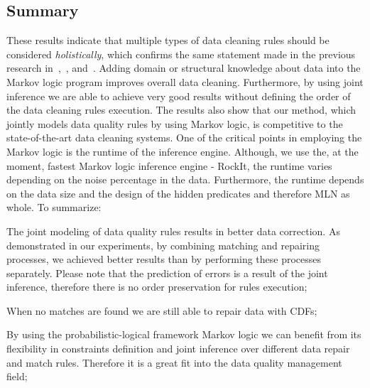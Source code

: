 \subsection{Summary}
These results indicate that multiple types of data cleaning rules should be considered \textit{holistically}, which confirms the same statement made in the previous research in~\cite{Dallachiesa:2013:NCD:2463676.2465327},~\cite{Fan:2014:IRM:2628135.2567657}, and~\cite{Fan:2011:IRM:1989323.1989373}. Adding domain or structural knowledge about data into the Markov logic program improves overall data cleaning. Furthermore, by using joint inference we are able to achieve very good results without defining the order of the data cleaning rules execution. The results also show that our method, which jointly models data quality rules by using Markov logic, is competitive to the state-of-the-art data cleaning systems. One of the critical points in employing the Markov logic is the runtime of the inference engine. Although, we use the, at the moment, fastest Markov logic inference engine - RockIt, the runtime varies depending on the noise percentage in the data. Furthermore, the runtime depends on the data size and the design of the hidden predicates and therefore MLN as whole.
To summarize:
\begin{inparaenum}[\itshape 1\upshape)]    
    	\item The joint modeling of data quality rules results in better data correction. As demonstrated in our experiments, by combining matching and repairing processes, we achieved better results than by performing these processes separately. Please note that the prediction of errors is a result of the joint inference, therefore there is no order preservation for rules execution;
    	\item When no matches are found we are still able to repair data with CDFs; 
    	\item By using the probabilistic-logical framework Markov logic we can benefit from its flexibility in constraints definition and joint inference over different data repair and match rules. Therefore it is a great fit into the data quality management field;
\end{inparaenum}


